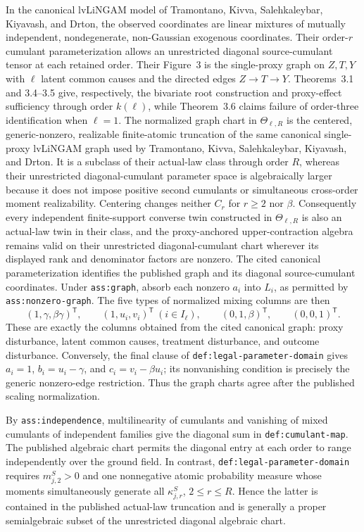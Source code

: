 In the canonical lvLiNGAM model of Tramontano, Kivva, Salehkaleybar, Kiyavash, and Drton, the observed coordinates are linear mixtures of mutually independent, nondegenerate, non-Gaussian exogenous coordinates.  Their order-\(r\) cumulant parameterization allows an unrestricted diagonal source-cumulant tensor at each retained order.  Their Figure~3 is the single-proxy graph on \(Z,T,Y\) with \(\ell\) latent common causes and the directed edges \(Z\to T\to Y\).  Theorems~3.1 and 3.4--3.5 give, respectively, the bivariate root construction and proxy-effect sufficiency through order \(k(\ell)\), while Theorem~3.6 claims failure of order-three identification when \(\ell=1\).
The normalized graph chart in \(\Theta_{\ell,R}\) is the centered, generic-nonzero, realizable finite-atomic truncation of the same canonical single-proxy lvLiNGAM graph used by Tramontano, Kivva, Salehkaleybar, Kiyavash, and Drton.  It is a subclass of their actual-law class through order \(R\), whereas their unrestricted diagonal-cumulant parameter space is algebraically larger because it does not impose positive second cumulants or simultaneous cross-order moment realizability.  Centering changes neither \(C_r\) for \(r\ge2\) nor \(\beta\).  Consequently every independent finite-support converse twin constructed in \(\Theta_{\ell,R}\) is also an actual-law twin in their class, and the proxy-anchored upper-contraction algebra remains valid on their unrestricted diagonal-cumulant chart wherever its displayed rank and denominator factors are nonzero.
The cited canonical parameterization identifies the published graph and its diagonal source-cumulant coordinates.  Under \texttt{ass:graph}, absorb each nonzero \(a_i\) into \(L_i\), as permitted by \texttt{ass:nonzero-graph}.  The five types of normalized mixing columns are then
\[
 (1,\gamma,\beta\gamma)^{\mathsf T},\qquad
 (1,u_i,v_i)^{\mathsf T}\ (i\in I_\ell),\qquad
 (0,1,\beta)^{\mathsf T},\qquad (0,0,1)^{\mathsf T}.
\]
These are exactly the columns obtained from the cited canonical graph: proxy disturbance, latent common causes, treatment disturbance, and outcome disturbance.  Conversely, the final clause of \texttt{def:legal-parameter-domain} gives \(a_i=1\), \(b_i=u_i-\gamma\), and \(c_i=v_i-\beta u_i\); its nonvanishing condition is precisely the generic nonzero-edge restriction.  Thus the graph charts agree after the published scaling normalization.

By \texttt{ass:independence}, multilinearity of cumulants and vanishing of mixed cumulants of independent families give the diagonal sum in \texttt{def:cumulant-map}.  The published algebraic chart permits the diagonal entry at each order to range independently over the ground field.  In contrast, \texttt{def:legal-parameter-domain} requires \(m^S_{j,2}>0\) and one nonnegative atomic probability measure whose moments simultaneously generate all \(\kappa^S_{j,r}\), \(2\le r\le R\).  Hence the latter is contained in the published actual-law truncation and is generally a proper semialgebraic subset of the unrestricted diagonal algebraic chart.

